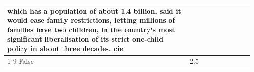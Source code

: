 \begin{table}[H]
\begin{tabular}{lllrlllll}
which has a population of about 1.4 billion, said it would ease family restrictions, letting millions of families have two children, in the country's most significant liberalisation of its strict one-child policy in about three decades. cie \\
\cline{1-9}
False & 2.5%
\end{tabular}
\end{table}
